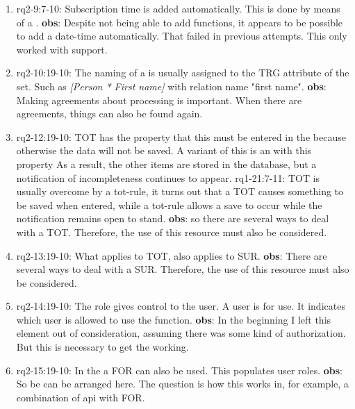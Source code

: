 \begin{enumerate}
    \item rq2-9:7-10: Subscription time is added automatically.
    This is done by means of a .
    \newline\textbf{obs}: Despite not being able to add  functions, it appears to be possible to add a date-time automatically.
    That failed in previous attempts.
    This only worked with support.
    
    \item rq2-10:19-10: The naming of a  is usually assigned to the TRG attribute of the set.
    Such as \textit{[Person * First name]} with relation name "first name".
    \newline\textbf{obs}: Making agreements about processing is important.
    When there are agreements, things can also be found again.
    
    \item rq2-12:19-10: TOT has the property that this must be entered in the  because otherwise the data will not be saved.
    A variant of this is an  with this property
    As a result, the other items are stored in the database, but a notification of incompleteness continues to appear.
    \newline rq1-21:7-11: TOT is usually overcome by a tot-rule, it turns out that a TOT causes something to be saved when entered, while a tot-rule allows a save to occur while the notification remains open to stand.
    \newline\textbf{obs}: so there are several ways to deal with a TOT.
    Therefore, the use of this resource must also be considered.
    
    \item rq2-13:19-10: What applies to  TOT, also applies to SUR. 
    \newline\textbf{obs}: There are several ways to deal with a SUR.
    Therefore, the use of this resource must also be considered.
    
    \item rq2-14:19-10: The role gives control to the user.
    A user is  for use.
    It indicates which user is allowed to use the function.
    \newline\textbf{obs}: In the beginning I left this element out of consideration, assuming there was some kind of authorization.
    But this is necessary to get the  working.
    
    \item rq2-15:19-10: In the  a FOR can also be used.
    This populates user roles.
    \newline\textbf{obs}: So be  can be arranged here.
    The question is how this works in, for example, a combination of api with FOR.
    

\end{enumerate}
